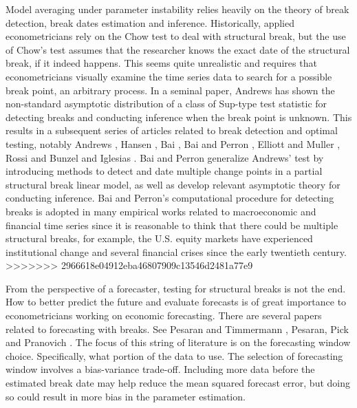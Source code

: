 Model averaging under parameter instability relies heavily on the theory of break detection, break dates estimation and inference. Historically, applied econometricians rely on the Chow test to deal with structural break, but the use of Chow's test assumes that the researcher knows the exact date of the structural break, if it indeed happens. This seems quite unrealistic and requires that econometricians visually examine the time series data to search for a possible break point, an arbitrary process. In a seminal paper, Andrews \cite{andrews93} has shown the non-standard asymptotic distribution of a class of Sup-type test statistic for detecting breaks and conducting inference when the break point is unknown. This results in a subsequent series of articles related to break detection and optimal testing, notably Andrews \cite{andrews_ploberger94} \cite{andrews2003}, Hansen \cite{hansen_JE2000}, Bai \cite{bai_ET1997} \cite{bai_JE1999}, Bai and Perron \cite{bai_perron98}, Elliott and Muller \cite{elliott_muller_RES2006}, Rossi \cite{rossi_ET2005} and Bunzel and Iglesias \cite{bunzel_iglesias}. Bai and Perron \cite{bai_perron98} generalize Andrews' test by introducing methods to detect and date multiple change points in a partial structural break linear model, as well as develop relevant asymptotic theory for conducting inference. Bai and Perron's computational procedure for detecting breaks is adopted in many empirical works related to macroeconomic and financial time series since it is reasonable to think that there could be multiple structural breaks, for example, the U.S. equity markets have experienced institutional change and several financial crises since the early twentieth century.
>>>>>>> 2966618e04912eba46807909c13546d2481a77e9

From the perspective of a forecaster, testing for structural breaks is not the end. How to better predict the future and evaluate forecasts is of great importance to econometricians working on economic forecasting. There are several papers related to forecasting with breaks. See Pesaran and Timmermann \cite{pesaran_timmermann_JE2007}, Pesaran, Pick and Pranovich \cite{pesaran_pick_pranovich_2011}. The focus of this string of literature is on the forecasting window choice. Specifically, what portion of the data to use. The selection of forecasting window involves a bias-variance trade-off. Including more data before the estimated break date may help reduce the mean squared forecast error, but doing so could result in more bias in the parameter estimation.

